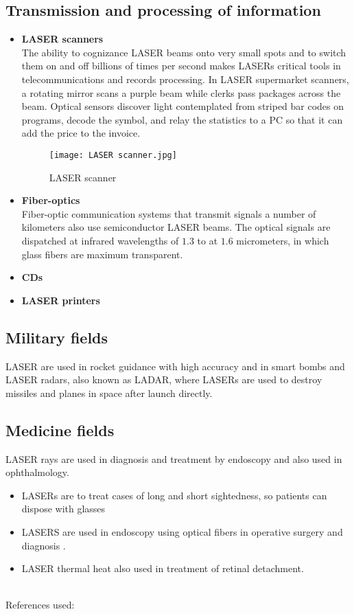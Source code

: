 \documentclass[a4paper,12pt]{article}
\begin{document}
\subsection{Transmission and processing of information}
\begin{itemize}
    \item \textbf{LASER scanners}
    \\ The ability to cognizance LASER beams onto very small spots and to switch them on and off billions of times per second makes LASERs critical tools in telecommunications and records processing. In LASER supermarket scanners, a rotating mirror scans a purple beam while clerks pass packages across the beam. Optical sensors discover light contemplated from striped bar codes on programs, decode the symbol, and relay the statistics to a PC so that it can add the price to the invoice. 
    \begin{figure}[h!]
   \centering
   \texttt{[image: LASER scanner.jpg]}
   \caption{LASER scanner}
   \label{fig:emission}
   \end{figure}
   \item \textbf{Fiber-optics}
   \\ Fiber-optic communication systems that transmit signals a number of kilometers also use semiconductor LASER beams. The optical signals are dispatched at infrared wavelengths of $1.3$ to at $1.6$ micrometers, in which glass fibers are maximum transparent.
   \item \textbf{CDs}
   \item \textbf{LASER printers}
\end{itemize}
\subsection{Military fields}
LASER are used in rocket guidance with high accuracy and in smart bombs and LASER radars, also known as LADAR, where LASERs are used to destroy missiles and planes in space after launch directly.
\subsection{Medicine fields}
LASER rays are used in diagnosis and treatment by endoscopy and also used in ophthalmology.
\begin{itemize}
    \item LASERs are to treat cases of long and short sightedness, so patients can dispose with glasses 
    \item LASERS are used in endoscopy using optical fibers in operative surgery and diagnosis .
    \item LASER thermal heat also used in treatment of retinal detachment.
\end{itemize}
\\
References used: \cite{G1} \cite{G3} \cite{G4} \cite{G5} \cite{G6} \cite{G7}
\newpage


\end{document}
